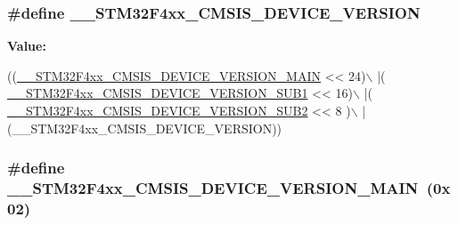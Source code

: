 \subsubsection[{\texorpdfstring{\+\_\+\+\_\+\+S\+T\+M32\+F4xx\+\_\+\+C\+M\+S\+I\+S\+\_\+\+D\+E\+V\+I\+C\+E\+\_\+\+V\+E\+R\+S\+I\+ON}{__STM32F4xx_CMSIS_DEVICE_VERSION}}]{\setlength{\rightskip}{0pt plus 5cm}\#define \+\_\+\+\_\+\+S\+T\+M32\+F4xx\+\_\+\+C\+M\+S\+I\+S\+\_\+\+D\+E\+V\+I\+C\+E\+\_\+\+V\+E\+R\+S\+I\+ON}\hypertarget{group___library__configuration__section_gab71225daca4a310275d65a487422b1f7}{}\label{group___library__configuration__section_gab71225daca4a310275d65a487422b1f7}
{\bfseries Value\+:}
\begin{DoxyCode}
((\hyperlink{group___library__configuration__section_ga802582d9b7b4dea8c8c53f6ce296dad2}{\_\_STM32F4xx\_CMSIS\_DEVICE\_VERSION\_MAIN} << 24)\(\backslash\)
                                                |(
      \hyperlink{group___library__configuration__section_gaa840ca8cc59044a45c604b95c546666b}{\_\_STM32F4xx\_CMSIS\_DEVICE\_VERSION\_SUB1} << 16)\(\backslash\)
                                                |(
      \hyperlink{group___library__configuration__section_ga5697f6bbcd478565105f00c06dc97a96}{\_\_STM32F4xx\_CMSIS\_DEVICE\_VERSION\_SUB2} << 8 )\(\backslash\)
                                                |(\_\_STM32F4xx\_CMSIS\_DEVICE\_VERSION))
\end{DoxyCode}
\subsubsection[{\texorpdfstring{\+\_\+\+\_\+\+S\+T\+M32\+F4xx\+\_\+\+C\+M\+S\+I\+S\+\_\+\+D\+E\+V\+I\+C\+E\+\_\+\+V\+E\+R\+S\+I\+O\+N\+\_\+\+M\+A\+IN}{__STM32F4xx_CMSIS_DEVICE_VERSION_MAIN}}]{\setlength{\rightskip}{0pt plus 5cm}\#define \+\_\+\+\_\+\+S\+T\+M32\+F4xx\+\_\+\+C\+M\+S\+I\+S\+\_\+\+D\+E\+V\+I\+C\+E\+\_\+\+V\+E\+R\+S\+I\+O\+N\+\_\+\+M\+A\+IN~(0x02)}\hypertarget{group___library__configuration__section_ga802582d9b7b4dea8c8c53f6ce296dad2}{}\label{group___library__configuration__section_ga802582d9b7b4dea8c8c53f6ce296dad2}


